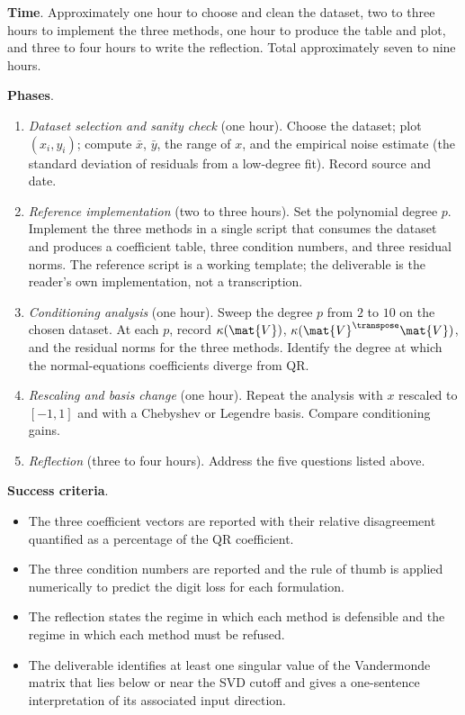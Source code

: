 \begin{project}
\textbf{Time}. Approximately one hour to choose and clean the
dataset, two to three hours to implement the three methods, one
hour to produce the table and plot, and three to four hours to
write the reflection. Total approximately seven to nine hours.

\textbf{Phases}.
\begin{enumerate}[leftmargin=*]
  \item \textit{Dataset selection and sanity check} (one hour).
    Choose the dataset; plot $(x_{i}, y_{i})$; compute $\bar{x}$,
    $\bar{y}$, the range of $x$, and the empirical noise estimate
    (the standard deviation of residuals from a low-degree fit).
    Record source and date.
  \item \textit{Reference implementation} (two to three hours).
    Set the polynomial degree $p$. Implement the three methods in
    a single script that consumes the dataset and produces a
    coefficient table, three condition numbers, and three residual
    norms. The reference script
     is a working template;
    the deliverable is the reader's own implementation, not a
    transcription.
  \item \textit{Conditioning analysis} (one hour). Sweep the degree
    $p$ from $2$ to $10$ on the chosen dataset. At each $p$, record
    $\kappa(\mat{V})$, $\kappa(\mat{V}^{\transpose}\mat{V})$, and
    the residual norms for the three methods. Identify the degree
    at which the normal-equations coefficients diverge from QR.
  \item \textit{Rescaling and basis change} (one hour). Repeat the
    analysis with $x$ rescaled to $[-1, 1]$ and with a Chebyshev
    or Legendre basis. Compare conditioning gains.
  \item \textit{Reflection} (three to four hours). Address the five
    questions listed above.
\end{enumerate}

\textbf{Success criteria}.
\begin{itemize}[leftmargin=*]
  \item The three coefficient vectors are reported with their
    relative disagreement quantified as a percentage of the QR
    coefficient.
  \item The three condition numbers are reported and the rule of
    thumb is applied numerically to predict the digit loss for each
    formulation.
  \item The reflection states the regime in which each method is
    defensible and the regime in which each method must be refused.
  \item The deliverable identifies at least one singular value of
    the Vandermonde matrix that lies below or near the SVD cutoff
    and gives a one-sentence interpretation of its associated input
    direction.
\end{itemize}


\end{project}
